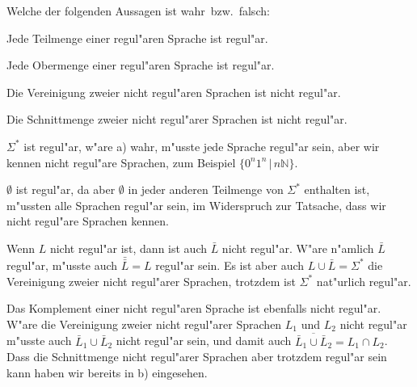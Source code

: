 Welche der folgenden Aussagen ist wahr~bzw.~falsch:
\begin{teilaufgaben}
\item Jede Teilmenge einer regul"aren Sprache ist regul"ar.
\item Jede Obermenge einer regul"aren Sprache ist regul"ar.
\item Die Vereinigung zweier nicht regul"aren Sprachen ist nicht regul"ar.
\item Die Schnittmenge zweier nicht regul"arer Sprachen ist nicht
regul"ar.
\end{teilaufgaben}

\begin{loesung}
\begin{teilaufgaben}
\item $\Sigma^*$ ist regul"ar, w"are a) wahr, m"usste jede Sprache regul"ar
sein, aber wir kennen nicht regul"are Sprachen, zum Beispiel
$\{0^n1^n\,|\,n\mathbb N\}$.
\item $\emptyset$ ist regul"ar, da aber $\emptyset$ in jeder anderen
Teilmenge von $\Sigma^*$ enthalten ist, m"ussten alle Sprachen regul"ar
sein, im Widerspruch zur Tatsache, dass wir nicht regul"are Sprachen
kennen.
\item Wenn $L$ nicht regul"ar ist, dann ist auch $\bar L$ nicht regul"ar.
W"are n"amlich $\bar L$ regul"ar, m"usste auch $\bar\bar L=L$ regul"ar
sein. Es ist aber auch $L\cup \bar L=\Sigma^*$ die Vereinigung zweier
nicht regul"arer Sprachen, trotzdem ist $\Sigma^*$ nat"urlich regul"ar.
\item Das Komplement einer nicht regul"aren Sprache ist ebenfalls nicht
regul"ar. W"are die Vereinigung zweier nicht regul"arer Sprachen $L_1$
und $L_2$ nicht regul"ar m"usste auch $\bar L_1\cup \bar L_2$ nicht
regul"ar sein, und damit auch $\overline{\bar L_1\cup \bar L_2}=L_1\cap L_2$.
Dass die Schnittmenge nicht regul"arer Sprachen aber trotzdem regul"ar
sein kann haben wir bereits in b) eingesehen.
\end{teilaufgaben}
\end{loesung}
